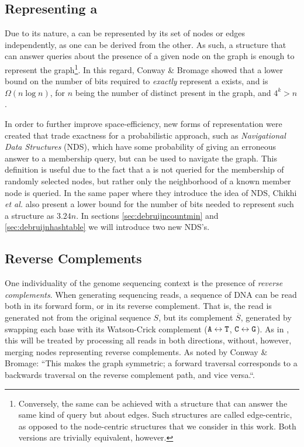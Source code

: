 \subsection{Representing a \dBG}


Due to its nature, a \dBG can be represented by its set of nodes or edges independently, as one can be derived from the other.
 As such, a structure that can answer queries about the presence of a given node on the graph is enough to
represent the graph\footnote{Conversely, the same can be achieved with a structure that can answer the same kind of query but about
edges. Such structures are called edge-centric, as opposed to the node-centric structures that we consider in this work. Both versions
are trivially equivalent, however.}. In this regard, Conway \& Bromage showed that a lower bound on the number of bits required to
\emph{exactly} represent a \dBG exists, and is $\Omega(n \log n)$, for $n$ being the number of distinct \kmers present in the graph,
and $4^k > n$\cite{Conway2011}.

In order to further improve space-efficiency, new forms of representation were created that trade exactness for a probabilistic approach,
such as \emph{Navigational Data Structures} (NDS), which have some probability of giving an erroneous answer to a membership query, 
but can be used to navigate the graph. This definition is useful due to the fact that a \dBG is not queried for the membership of randomly
selected nodes, but rather only the neighborhood of a known member node is queried\cite{Chikhi2014}. In the same paper where they introduce
the idea of NDS, Chikhi \emph{et al.} also present a lower bound for the number of bits needed to represent such a structure as $3.24n$.
In sections \ref{sec:debruijncountmin} and \ref{sec:debruijnhashtable} we will introduce two new NDS's. 

\subsection{Reverse Complements}

One individuality of the genome sequencing context is the presence of \emph{reverse complements}. When generating sequencing reads,
a sequence of DNA can be read both in its forward form, or in its reverse complement. That is, the read is generated not from the
original sequence $S$, but its complement $\overline{S}$, generated by swapping each base with its Watson-Crick complement
($\mathtt{A} \leftrightarrow \mathtt{T}$, $\mathtt{C} \leftrightarrow \mathtt{G}$). As in \cite{Conway2011}, this will be treated by processing all reads in both
directions, without, however, merging nodes representing reverse complements. As noted by Conway \& Bromage: ``This makes the graph
symmetric; a forward traversal corresponds to a backwards traversal on the reverse complement path, and vice versa.``\cite{Conway2011}.


